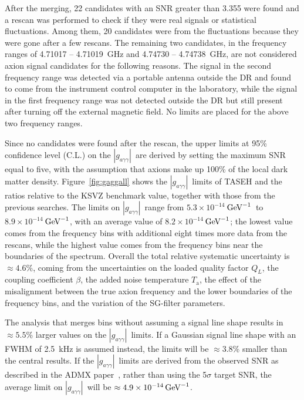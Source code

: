 \documentclass[%
 reprint,prl, %
superscriptaddress,
nobibnotes,
 amsmath,amssymb,
 aps,
]{revtex4-2}
\newcommand{\gagg}{\ensuremath{\left|g_{a\gamma\gamma}\right|}}
\newcommand{\ta}{\ensuremath{T_\text{a}}}
\newcommand{\GeVinv}{\ensuremath{\,\text{Ge\hspace{-.08em}V}^{-1}}}
\newcommand{\avelimit}{\ensuremath{8.2\times 10^{-14}}} %
\newcommand{\ADMXavelimit}{\ensuremath{4.9\times 10^{-14}}}
\newcommand{\lolimit}{\ensuremath{5.3\times 10^{-14}}}
\newcommand{\hilimit}{\ensuremath{8.9\times 10^{-14}}}
\begin{document}
After the merging, 22 candidates with an SNR greater than 3.355 were found and 
a rescan was performed to check if they were real signals  
or statistical fluctuations.        
Among them, 20 candidates were from the fluctuations because they were gone 
after a few rescans. 
The remaining two candidates, in the frequency ranges of 
4.71017 -- 4.71019~GHz and 4.74730 -- 4.74738~GHz, are not 
considered axion signal candidates for the following reasons. 
The signal in the second frequency range was detected via a portable antenna 
outside the DR and found 
to come from the instrument control computer in the laboratory, while the 
signal in the first frequency range was not 
detected outside the DR but still present after 
turning off the external magnetic field. 
No limits are placed for the above two frequency ranges.  

Since no candidates were found after the rescan, the upper limits 
at 95\% confidence level (C.L.) on the \gagg\ are derived by setting the 
maximum SNR equal to five, 
with the assumption that axions make up 100\% of the local dark matter 
density.  
Figure~\ref{fig:gaggall} shows the \gagg\ limits of TASEH and the 
ratios relative to the KSVZ benchmark value,  
 together with those from the previous searches. 
The limits on 
\gagg\ range from \lolimit\GeVinv\ to \hilimit\GeVinv, with an average 
value of \avelimit\GeVinv; the lowest value comes from the frequency bins with 
additional eight times more data from the rescans, while the highest value 
comes from the frequency bins near the boundaries of the spectrum. 
Overall the total relative systematic uncertainty is 
$\approx 4.6\%$, coming from the uncertainties on the loaded quality 
factor $Q_L$, the coupling coefficient $\beta$, the added noise temperature 
\ta, the effect of the misalignment between the true axion frequency and 
the lower boundaries of the frequency bins, and the variation of the 
SG-filter parameters. 


The analysis that merges bins without 
assuming a signal line shape results in $\approx5.5$\% larger values on the 
\gagg\ limits. If a Gaussian signal line shape with an FWHM of 2.5~kHz  
 is assumed instead, the limits will be $\approx3.8$\% smaller than the 
central results. If the \gagg\ limits are derived from the observed SNR as 
described in the ADMX paper~\cite{ADMXVIII}, 
rather than using the 5$\sigma$ target SNR, the average limit on \gagg\ will 
be $\approx\ADMXavelimit\GeVinv$. 
\end{document}
